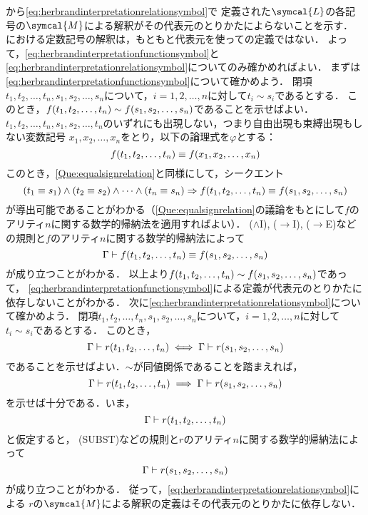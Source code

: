 から\cref{eq:herbrandinterpretationrelationsymbol}で
定義された\(\symcal{L}\)の各記号の\(\symcal{M}\)による解釈がその代表元のとりかたによらないことを示す．
における定数記号の解釈は，もともと代表元を使っての定義ではない．
よって，\cref{eq:herbrandinterpretationfunctionsymbol}と\cref{eq:herbrandinterpretationrelationsymbol}についてのみ確かめればよい．
まずは\cref{eq:herbrandinterpretationfunctionsymbol}について確かめよう．
閉項\(t_1, t_2, \dots, t_n, s_1, s_2, \dots, s_n\)について，\(i = 1, 2, \dots, n\)に対して\(t_i \sim s_i\)であるとする．
このとき，\(\apply{f}{t_1, t_2, \dots, t_n} \sim \apply{f}{s_1, s_2, \dots, s_n}\)であることを示せばよい．
\(t_1, t_2, \dots, t_n, s_1, s_2, \dots, t_n\)のいずれにも出現しない，つまり自由出現も束縛出現もしない変数記号
\(x_1, x_2, \dots, x_n\)をとり，以下の論理式を\(\varphi\)とする：
\[
	\apply{f}{t_1, t_2, \dots, t_n} \objeq \apply{f}{x_1, x_2, \dots, x_n}
\]
このとき，\cref{Que:equalsignrelation}と同様にして，シークエント
\[
	\paren{t_1 \objeq s_1} \land \paren{t_2 \objeq s_2} \land \dotsb \land \paren{t_n \objeq s_n}
	\sequent \apply{f}{t_1, t_2, \dots, t_n} \objeq \apply{f}{s_1, s_2, \dots, s_n}
\]
が導出可能であることがわかる（\cref{Que:equalsignrelation}の議論をもとにして\(f\)のアリティ\(n\)に関する数学的帰納法を適用すればよい）．
(\(\land\)I), (\(\to\)I), (\(\to\)E)などの規則と\(f\)のアリティ\(n\)に関する数学的帰納法によって
\[
	\Gamma \provable \apply{f}{t_1, t_2, \dots, t_n} \objeq \apply{f}{s_1, s_2, \dots, s_n}
\]
が成り立つことがわかる．
以上より\(\apply{f}{t_1, t_2, \dots, t_n} \sim \apply{f}{s_1, s_2, \dots, s_n}\)であって，
\cref{eq:herbrandinterpretationfunctionsymbol}による定義が代表元のとりかたに依存しないことがわかる．
次に\cref{eq:herbrandinterpretationrelationsymbol}について確かめよう．
閉項\(t_1, t_2, \dots, t_n, s_1, s_2, \dots, s_n\)について，\(i = 1, 2, \dots, n\)に対して\(t_i \sim s_i\)であるとする．
このとき，
\[
	\Gamma \provable \apply{r}{t_1, t_2, \dots, t_n} \metaequivalent \Gamma \provable \apply{r}{s_1, s_2, \dots, s_n}
\]
であることを示せばよい．\(\sim\)が同値関係であることを踏まえれば，
\[
	\Gamma \provable \apply{r}{t_1, t_2, \dots, t_n} \metaimplies \Gamma \provable \apply{r}{s_1, s_2, \dots, s_n}
\]
を示せば十分である．いま，
\[
	\Gamma \provable \apply{r}{t_1, t_2, \dots, t_n}
\]
と仮定すると，
(SUBST)などの規則と\(r\)のアリティ\(n\)に関する数学的帰納法によって
\[
	\Gamma \provable \apply{r}{s_1, s_2, \dots, s_n}
\]
が成り立つことがわかる．
従って，\cref{eq:herbrandinterpretationrelationsymbol}による
\(r\)の\(\symcal{M}\)による解釈の定義はその代表元のとりかたに依存しない．


